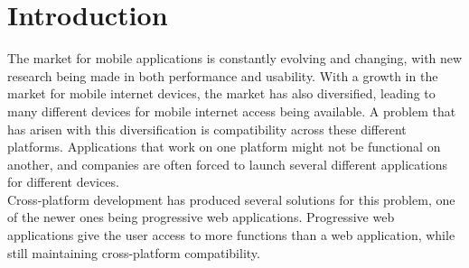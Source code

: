 \section{Introduction}

The market for mobile applications is constantly evolving and changing, with new research being made in both performance and usability. With a growth in the market for mobile internet devices, the market has also diversified, leading to many different devices for mobile internet access being available. A problem that has arisen with this diversification is compatibility across these different platforms. Applications that work on one platform might not be functional on another, and companies are often forced to launch several different applications for different devices. \\
Cross-platform development has produced several solutions for this problem, one of the newer ones being progressive web applications. Progressive web applications give the user access to more functions than a web application, while still maintaining cross-platform compatibility. 

